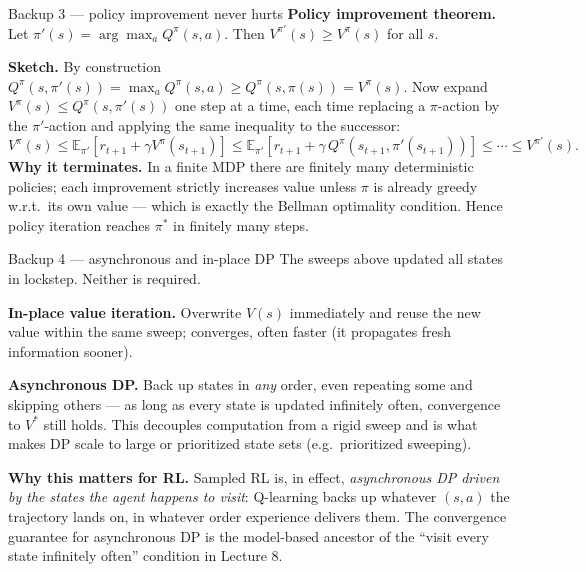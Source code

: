 \documentclass[10pt, aspectratio=169]{beamer}
\begin{document}
\begin{frame}{Backup 3 --- policy improvement never hurts}
\footnotesize
\textbf{Policy improvement theorem.} Let $\pi' (s)=\arg\max_a Q^\pi(s,a)$. Then $V^{\pi'}(s)\ge V^\pi(s)$ for all $s$.
\medskip

\textbf{Sketch.} By construction $Q^\pi(s,\pi'(s)) = \max_a Q^\pi(s,a) \ge Q^\pi(s,\pi(s)) = V^\pi(s)$. Now expand $V^\pi(s)\le Q^\pi(s,\pi'(s))$ one step at a time, each time replacing a $\pi$-action by the $\pi'$-action and applying the same inequality to the successor:
\[
V^\pi(s) \le \mathbb{E}_{\pi'}[r_{t+1} + \gamma V^\pi(s_{t+1})] \le \mathbb{E}_{\pi'}[r_{t+1} + \gamma\, Q^\pi(s_{t+1},\pi'(s_{t+1}))] \le \cdots \le V^{\pi'}(s).
\]
\textbf{Why it terminates.} In a finite MDP there are finitely many deterministic policies; each improvement strictly increases value unless $\pi$ is already greedy w.r.t.\ its own value --- which is exactly the Bellman optimality condition. Hence policy iteration reaches $\pi^*$ in finitely many steps.
\end{frame}

\begin{frame}{Backup 4 --- asynchronous and in-place DP}
\footnotesize
The sweeps above updated all states in lockstep. Neither is required.
\medskip

\textbf{In-place value iteration.} Overwrite $V(s)$ immediately and reuse the new value within the same sweep; converges, often faster (it propagates fresh information sooner).
\medskip

\textbf{Asynchronous DP.} Back up states in \emph{any} order, even repeating some and skipping others --- as long as every state is updated infinitely often, convergence to $V^*$ still holds. This decouples computation from a rigid sweep and is what makes DP scale to large or prioritized state sets (e.g.\ prioritized sweeping).
\medskip

\textbf{Why this matters for RL.} Sampled RL is, in effect, \emph{asynchronous DP driven by the states the agent happens to visit}: Q-learning backs up whatever $(s,a)$ the trajectory lands on, in whatever order experience delivers them. The convergence guarantee for asynchronous DP is the model-based ancestor of the ``visit every state infinitely often'' condition in Lecture 8.
\end{frame}
\end{document}
